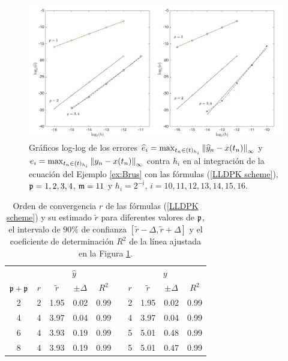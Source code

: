 \begin{figure}[htb]
	\begin{center}
		\includegraphics[scale=0.45]{Graphics/lldp/p-plots.jpg}
		\caption{Gráficos log-log de los errores $\widehat{e}_i=\max_{t_n\in(t)_{h_i}}\left\lVert \widehat{y}_n-x(t_n) \right\rVert_\infty$ y $e_i=\max_{t_n\in(t)_{h_i}}\left\lVert y_n-x(t_n) \right\rVert_\infty$ contra $h_i$ en al integración de la ecuación del Ejemplo \ref{ex:Brus} con las fórmulas (\ref{LLDPK scheme}), $\mathfrak{p}=1,2,3,4$, $\mathfrak{m}=11$ y $h_i=2^{-i}$, $i=10,11,12,13,14,15,16$.}
		\label{fig:num-exp-lldp-fix-step:Fig2}
	\end{center}
\end{figure}

\begin{table}[htb]
	\centering
	\caption{
		Orden de convergencia $r$ de las fórmulas (\ref{LLDPK scheme}) y su estimado  $\widetilde{r}$ para diferentes valores de $\mathfrak{p}$, el intervalo de $90\%$ de confianza $[\widetilde{r}-\varDelta,\widetilde{r}+\varDelta]$ y el coeficiente de determinación $R^2$ de la línea ajustada en la Figura \ref{fig:num-exp-lldp-fix-step:Fig2}.}
		\begin{tabular}{ c  c c c c  c  c c c c}
			\hline
			& \multicolumn{4}{c}{$\widehat{y}$} & & \multicolumn{4}{c}{$y$} \\
			\cline{2-5} \cline{7-10}
			$\mathfrak{p}+\mathfrak{p}$ & $r$ & $\widetilde{r}$ & $\pm\varDelta$ & $R^2$ & & $r$ & $\widetilde{r}$ & $\pm\varDelta$ & $R^2$ \\
			\hline
			2 & 2 & 1.95 & 0.02 & 0.99 & & 2 & 1.95 & 0.02 & 0.99 \\
			4 & 4 & 3.97 & 0.04 & 0.99 & & 4 & 3.97 & 0.04 & 0.99 \\
			6 & 4 & 3.93 & 0.19 & 0.99 & & 5 & 5.01 & 0.48 & 0.99 \\
			8 & 4 & 3.93 & 0.19 & 0.99 & & 5 & 5.01 & 0.47 & 0.99 \\
			\hline
		\end{tabular}
	\label{tab:num-exp-lldp-fix-step:porders}
\end{table}

